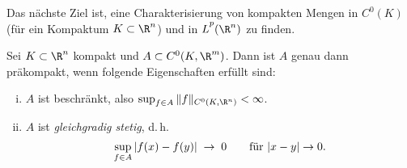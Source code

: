 Das nächste Ziel ist, eine Charakterisierung von kompakten Mengen in $C^0(K)$
(für ein Kompaktum $K\subset\R^n$) und in $\Lpp(\R^n)$ zu finden.

\begin{thSatz} \label{vl27:arzelaascoli}
    Sei $K\subset\R^n$ kompakt und $A\subset C^0(K,\R^m)$. Dann ist $A$ genau
    dann präkompakt, wenn folgende Eigenschaften erfüllt sind:
    \begin{enumerate}[(i)]
        \item \label{vl27:arzelaascoli:i}
            $A$ ist beschränkt, also
            $\sup_{f\in A} \, \norm{f}_{C^0(K,\R^n)} < \infty$.
            
        \item \label{vl27:arzelaascoli:ii}
            $A$ ist \emph{gleichgradig stetig}, d.\,h.
            \[ \sup_{f\in A} \, \abs{f(x)-f(y)} \;\to\; 0 \fuer \abs{x-y}\to 0
            . \]
    \end{enumerate}
\end{thSatz}


